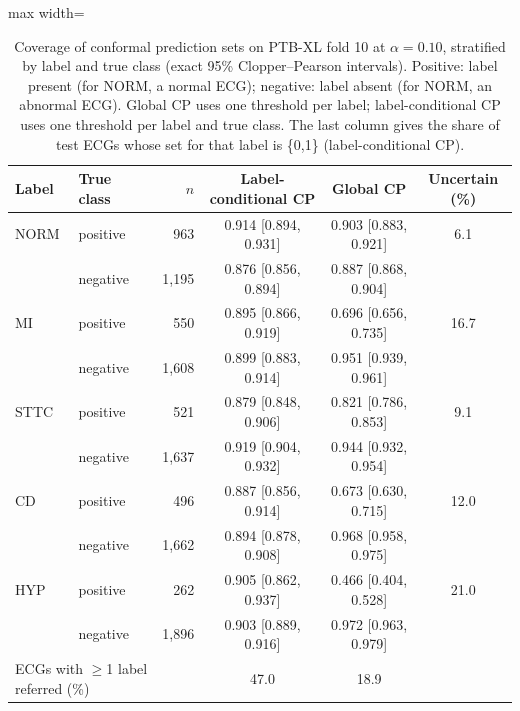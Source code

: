 \begin{table}[!htbp]
\centering\small
\caption{Coverage of conformal prediction sets on PTB-XL fold 10 at $\alpha=0.10$, stratified by label and true class (exact 95\% Clopper--Pearson intervals). Positive: label present (for NORM, a normal ECG); negative: label absent (for NORM, an abnormal ECG). Global CP uses one threshold per label; label-conditional CP uses one threshold per label and true class. The last column gives the share of test ECGs whose set for that label is \{0,1\} (label-conditional CP).}
\label{tab:conformal}
\setlength{\tabcolsep}{3.5pt}
\begin{adjustbox}{max width=\linewidth}
\begin{tabular}{llrccc}
\toprule
Label & True class & $n$ & Label-conditional CP & Global CP & Uncertain (\%) \\
\midrule
NORM & positive & 963 & 0.914 [0.894, 0.931] & 0.903 [0.883, 0.921] & 6.1 \\
 & negative & 1,195 & 0.876 [0.856, 0.894] & 0.887 [0.868, 0.904] &  \\
MI & positive & 550 & 0.895 [0.866, 0.919] & 0.696 [0.656, 0.735] & 16.7 \\
 & negative & 1,608 & 0.899 [0.883, 0.914] & 0.951 [0.939, 0.961] &  \\
STTC & positive & 521 & 0.879 [0.848, 0.906] & 0.821 [0.786, 0.853] & 9.1 \\
 & negative & 1,637 & 0.919 [0.904, 0.932] & 0.944 [0.932, 0.954] &  \\
CD & positive & 496 & 0.887 [0.856, 0.914] & 0.673 [0.630, 0.715] & 12.0 \\
 & negative & 1,662 & 0.894 [0.878, 0.908] & 0.968 [0.958, 0.975] &  \\
HYP & positive & 262 & 0.905 [0.862, 0.937] & 0.466 [0.404, 0.528] & 21.0 \\
 & negative & 1,896 & 0.903 [0.889, 0.916] & 0.972 [0.963, 0.979] &  \\
\midrule
\multicolumn{3}{l}{ECGs with $\ge$1 label referred (\%)} & 47.0 & 18.9 & \\
\bottomrule
\end{tabular}
\end{adjustbox}
\end{table}
